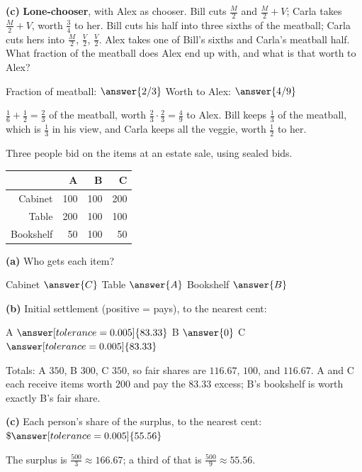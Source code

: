 \documentclass[12pt]{ximera}
\begin{document}
\begin{problem}
\begin{prompt}
\textbf{(c)} \textbf{Lone-chooser}, with Alex as chooser. Bill cuts $\frac M2$ and
$\frac M2+V$; Carla takes $\frac M2+V$, worth $\frac34$ to her. Bill cuts his half into
three sixths of the meatball; Carla cuts hers into $\frac M2$, $\frac V2$, $\frac V2$.
Alex takes one of Bill's sixths and Carla's meatball half. What fraction of the meatball
does Alex end up with, and what is that worth to Alex?

Fraction of meatball: $\answer{2/3}$ \quad Worth to Alex: $\answer{4/9}$
\begin{feedback}
$\frac16+\frac12=\frac23$ of the meatball, worth $\frac23\cdot\frac23=\frac49$ to Alex.
Bill keeps $\frac13$ of the meatball, which is $\frac13$ in his view, and Carla keeps all
the veggie, worth $\frac12$ to her.
\end{feedback}
\end{prompt}
\end{problem}

\begin{problem}
Three people bid on the items at an estate sale, using sealed bids.
\begin{center}
\begin{tabular}{r|rrr}
 & A & B & C\\\hline
Cabinet & 100 & 100 & 200\\
Table & 200 & 100 & 100\\
Bookshelf & 50 & 100 & 50
\end{tabular}
\end{center}

\begin{prompt}
\textbf{(a)} Who gets each item?

Cabinet $\answer{C}$ \quad Table $\answer{A}$ \quad Bookshelf $\answer{B}$
\end{prompt}

\begin{prompt}
\textbf{(b)} Initial settlement (positive = pays), to the nearest cent:

A $\answer[tolerance=0.005]{83.33}$ \quad B $\answer{0}$ \quad C
$\answer[tolerance=0.005]{83.33}$
\begin{feedback}
Totals: A $350$, B $300$, C $350$, so fair shares are $116.67$, $100$, and $116.67$. A and C
each receive items worth $200$ and pay the $83.33$ excess; B's bookshelf is worth exactly
B's fair share.
\end{feedback}
\end{prompt}

\begin{prompt}
\textbf{(c)} Each person's share of the surplus, to the nearest cent:
$\$\answer[tolerance=0.005]{55.56}$
\begin{feedback}
The surplus is $\frac{500}3\approx166.67$; a third of that is $\frac{500}9\approx55.56$.
\end{feedback}
\end{prompt}
\end{problem}
\end{document}
